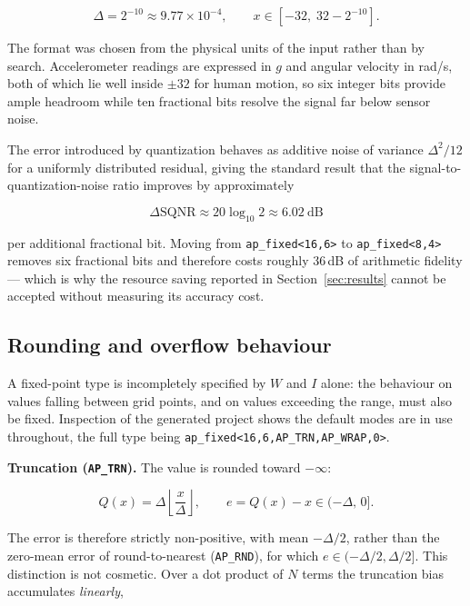 \documentclass[11pt,a4paper]{article}
\begin{document}
\begin{equation}
\Delta = 2^{-10} \approx 9.77 \times 10^{-4},
\qquad
x \in [-32,\; 32 - 2^{-10}].
\end{equation}

The format was chosen from the physical units of the input rather than by
search. Accelerometer readings are expressed in $g$ and angular velocity in
rad/s, both of which lie well inside $\pm 32$ for human motion, so six integer
bits provide ample headroom while ten fractional bits resolve the signal far
below sensor noise.

The error introduced by quantization behaves as additive noise of variance
$\Delta^2/12$ for a uniformly distributed residual, giving the standard result
that the signal-to-quantization-noise ratio improves by approximately

\begin{equation}
\Delta \mathrm{SQNR} \approx 20 \log_{10} 2 \approx 6.02\ \mathrm{dB}
\end{equation}

per additional fractional bit. Moving from \texttt{ap\_fixed<16,6>} to
\texttt{ap\_fixed<8,4>} removes six fractional bits and therefore costs roughly
36\,dB of arithmetic fidelity --- which is why the resource saving reported in
Section~\ref{sec:results} cannot be accepted without measuring its accuracy
cost.

\subsection{Rounding and overflow behaviour}

A fixed-point type is incompletely specified by $W$ and $I$ alone: the
behaviour on values falling between grid points, and on values exceeding the
range, must also be fixed. Inspection of the generated project shows the
default modes are in use throughout, the full type being
\texttt{ap\_fixed<16,6,AP\_TRN,AP\_WRAP,0>}.

\textbf{Truncation (\texttt{AP\_TRN}).} The value is rounded toward $-\infty$:

\begin{equation}
Q(x) = \Delta \left\lfloor \frac{x}{\Delta} \right\rfloor,
\qquad
e = Q(x) - x \in (-\Delta,\, 0].
\end{equation}

The error is therefore strictly non-positive, with mean $-\Delta/2$, rather
than the zero-mean error of round-to-nearest (\texttt{AP\_RND}), for which
$e \in (-\Delta/2, \Delta/2]$. This distinction is not cosmetic. Over a dot
product of $N$ terms the truncation bias accumulates \emph{linearly},
\end{document}
